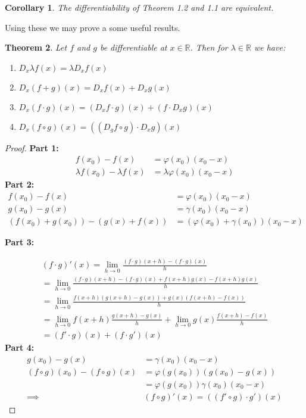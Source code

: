\documentclass{article}
\theoremstyle{plain}
\newtheorem{theorem}{Theorem}
\newtheorem{corollary}[theorem]{Corollary}
\theoremstyle{definition}
\begin{document}
\begin{corollary}
The differentiability of Theorem 1.2 and 1.1 are equivalent. 
\end{corollary}

Using these we may prove a some useful results.

\begin{theorem}
Let $f$ and $g$ be differentiable at $x \in \mathbb{R}$. Then for $\lambda \in \mathbb{R}$ we have:
\begin{enumerate}
	\item $D_x \lambda f(x)= \lambda D_x f(x)$
    \item $D_x(f+g)(x) = D_x f(x)+D_x g(x)$
    \item $D_x (f\cdot g)(x) = (D_x f \cdot g)(x)+(f \cdot D_x g)(x)$
    \item $D_x(f\circ g)(x) = ((D_g f \circ g)\cdot D_x g)(x)$
\end{enumerate}
\end{theorem}
\begin{proof}
\textbf{Part 1:} 
\begin{align}
	f(x_0)-f(x) &= \varphi(x_0)(x_0-x) \\
	\lambda f(x_0)-\lambda f(x) &= \lambda \varphi(x_0)(x_0-x) \nonumber
\end{align}
\textbf{Part 2:}
\begin{align}
	f(x_0)-f(x) &= \varphi(x_0)(x_0-x) \\
	g(x_0)-g(x) &= \gamma(x_0)(x_0-x) \nonumber \\
	(f(x_0)+g(x_0))-(g(x)+f(x))&= (\varphi(x_0)+\gamma(x_0))(x_0-x) \nonumber
\end{align}

\textbf{Part 3:}

\begin{align}
    (f\cdot g)'(x) = \lim_{h \rightarrow 0} \frac{(f\cdot g)(x+h)-(f
    \cdot g)(x)}{h} \\ \nonumber = \lim_{h \rightarrow 0} \frac{(f\cdot
    g)(x+h)-(f \cdot g)(x)+f(x+h)g(x)-f(x+h)g(x)}{h} \\ \nonumber =
    \lim_{h \rightarrow 0} \frac{f(x+h)(g(x+h)-g(x))+g(x)(f(x+h)-f(x))}{h}
    \\ \nonumber = \lim_{h \rightarrow 0} f(x+h)\frac{g(x+h)-g(x)}{h}
    + \lim_{h \rightarrow 0} g(x)\frac{f(x+h)-f(x)}{h} \\ \nonumber =
    (f' \cdot g)(x)+(f \cdot g')(x) \nonumber
\end{align}
\textbf{Part 4:}
\begin{align}
    g(x_0)-g(x)&=\gamma(x_0)(x_0-x) \\ 
    (f\circ g)(x_0) - (f\circ g)(x) &=\varphi(g(x_0))(g(x_0)-g(x)) \\ \nonumber
    &= \varphi(g(x_0))\gamma(x_0)(x_0-x) \\ \nonumber
    \implies &(f \circ g)'(x) = ((f' \circ g)\cdot g')(x) \nonumber
\end{align}
\end{proof}
\end{document}
